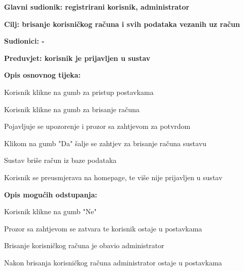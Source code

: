 				
				
					\noindent {}
					\begin{packed_item}
						\item \textbf{Glavni sudionik: registrirani korisnik, administrator}
						\item  \textbf{Cilj: brisanje korisničkog računa i svih podataka vezanih uz račun}
						\item  \textbf{Sudionici: -}
						\item  \textbf{Preduvjet: korisnik je prijavljen u sustav}
						
						\item  \textbf{Opis osnovnog tijeka:}
						\item[] \begin{packed_enum}
							\item Korisnik klikne na gumb za pristup postavkama
							\item Korisnik klikne na gumb za brisanje računa
							\item Pojavljuje se upozorenje i prozor sa zahtjevom za potvrdom
							\item Klikom na gumb "Da" šalje se zahtjev za brisanje računa sustavu
							\item Sustav briše račun iz baze podataka
							\item Korisnik se preusmjerava na homepage, te više nije prijavljen u sustav
						\end{packed_enum}
						
						\item  \textbf{Opis mogućih odstupanja:}
						\item[] \begin{packed_item}							
							\item[4.a] Korisnik klikne na gumb "Ne"
							\begin{packed_enum}
								\item Prozor sa zahtjevom se zatvara te korisnik ostaje u postavkama
							\end{packed_enum}
							\item[6.a] Brisanje korisničkog računa je obavio administrator
							\begin{packed_enum}
								\item Nakon brisanja korisničkog računa administrator ostaje u postavkama
							\end{packed_enum}
						\end{packed_item}
					\end{packed_item}




